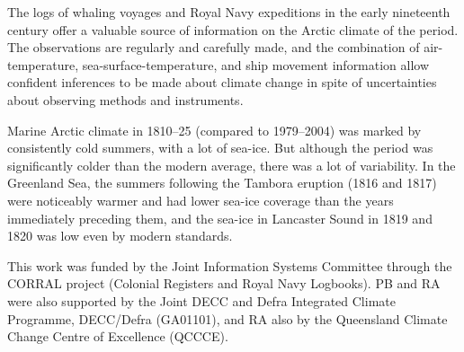 \documentclass[CP]{copernicus}
\begin{document}
\conclusions

The logs of whaling voyages and Royal Navy expeditions in the early nineteenth century offer a valuable source of information on the Arctic climate of the period. The observations are regularly and carefully made, and the combination of air-temperature, sea-surface-temperature, and ship movement information allow confident inferences to be made about climate change in spite of uncertainties about observing methods and instruments. 

Marine Arctic climate in 1810--25 (compared to 1979--2004) was marked by consistently cold summers, with a lot of sea-ice. But although the period was significantly colder than the modern average, there was a lot of variability. In the Greenland Sea, the summers following the Tambora eruption (1816 and 1817) were noticeably warmer and had lower sea-ice coverage than the years immediately preceding them, and the sea-ice in Lancaster Sound in 1819 and 1820 was low even by modern standards.

\begin{acknowledgement}
This work was funded by the Joint Information Systems Committee through the CORRAL project (Colonial Registers and Royal Navy Logbooks). PB and RA were also supported by the Joint DECC and Defra Integrated Climate Programme, DECC/Defra (GA01101), and RA also by the Queensland Climate Change Centre of Excellence (QCCCE). 
\end{acknowledgement}



\end{document}
